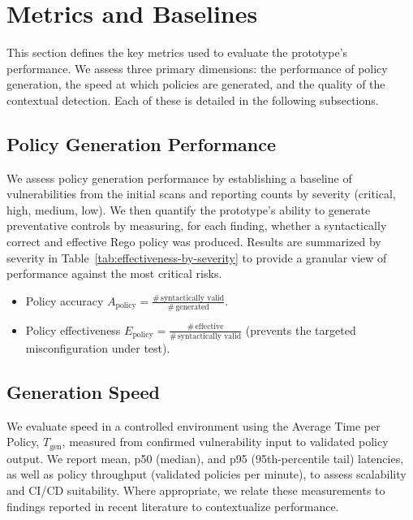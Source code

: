 \section{Metrics and Baselines}\label{sec:metrics-and-baselines}

This section defines the key metrics used to evaluate the prototype's performance. We assess three primary dimensions: the performance of policy generation, the speed at which policies are generated, and the quality of the contextual detection. Each of these is detailed in the following subsections.

\subsection{Policy Generation Performance}\label{sec:metrics-effectiveness}

We assess policy generation performance by establishing a baseline of vulnerabilities from the initial scans and reporting counts by severity (critical, high, medium, low). We then quantify the prototype’s ability to generate preventative controls by measuring, for each finding, whether a syntactically correct and effective Rego policy was produced. Results are summarized by severity in Table~\ref{tab:effectiveness-by-severity} to provide a granular view of performance against the most critical risks.

\begin{itemize}
	\item Policy accuracy $A_{\text{policy}} = \frac{\#\,\text{syntactically valid}}{\#\,\text{generated}}$.
	\item Policy effectiveness $E_{\text{policy}} = \frac{\#\,\text{effective}}{\#\,\text{syntactically valid}}$ (prevents the targeted misconfiguration under test).
\end{itemize}

\subsection{Generation Speed}\label{sec:metrics-speed}

We evaluate speed in a controlled environment using the Average Time per Policy, $T_{\text{gen}}$, measured from confirmed vulnerability input to validated policy output. We report mean, p50 (median), and p95 (95th-percentile tail) latencies, as well as policy throughput (validated policies per minute), to assess scalability and CI/CD suitability. Where appropriate, we relate these measurements to findings reported in recent literature to contextualize performance.

